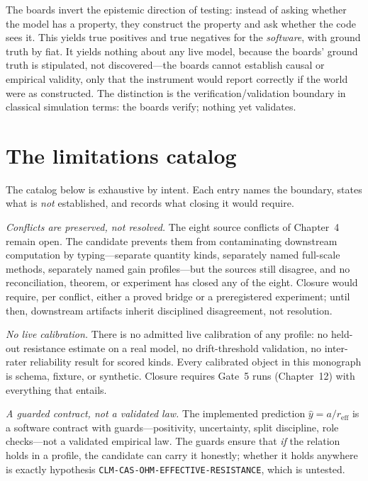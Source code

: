 \begin{remark}\label{evid:rem:boards}
The boards invert the epistemic direction of testing: instead of asking whether the model has a property, they construct the property and ask whether the code sees it. This yields true positives and true negatives for the \emph{software}, with ground truth by fiat. It yields nothing about any live model, because the boards' ground truth is stipulated, not discovered---the boards cannot establish causal or empirical validity, only that the instrument would report correctly if the world were as constructed. The distinction is the verification/validation boundary in classical simulation terms: the boards verify; nothing yet validates.
\end{remark}

\section{The limitations catalog}\label{evid:sec:limits}

The catalog below is exhaustive by intent. Each entry names the boundary, states what is \emph{not} established, and records what closing it would require.

\emph{Conflicts are preserved, not resolved.} The eight source conflicts of Chapter~4 remain open. The candidate prevents them from contaminating downstream computation by typing---separate quantity kinds, separately named full-scale methods, separately named gain profiles---but the sources still disagree, and no reconciliation, theorem, or experiment has closed any of the eight. Closure would require, per conflict, either a proved bridge or a preregistered experiment; until then, downstream artifacts inherit disciplined disagreement, not resolution.

\emph{No live calibration.} There is no admitted live calibration of any profile: no held-out resistance estimate on a real model, no drift-threshold validation, no inter-rater reliability result for scored kinds. Every calibrated object in this monograph is schema, fixture, or synthetic. Closure requires Gate~5 runs (Chapter~12) with everything that entails.

\emph{A guarded contract, not a validated law.} The implemented prediction $\hat y = a / r_{\mathrm{eff}}$ is a software contract with guards---positivity, uncertainty, split discipline, role checks---not a validated empirical law. The guards ensure that \emph{if} the relation holds in a profile, the candidate can carry it honestly; whether it holds anywhere is exactly hypothesis \texttt{CLM-CAS-OHM-EFFECTIVE-RESISTANCE}, which is untested.

